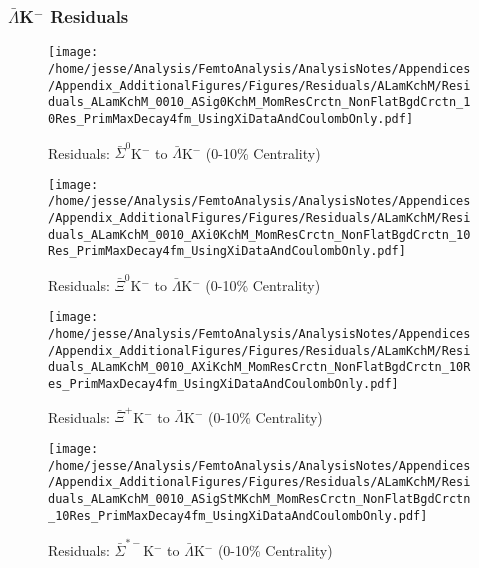 \documentclass[/home/jesse/Analysis/FemtoAnalysis/AnalysisNotes/AnalysisNoteJBuxton.tex]{subfiles}
\begin{document}
\subsubsection{\texorpdfstring{$\bar{\Lambda}$K$^{-}$}{TEXT} Residuals}
\label{Residuals_ALamKchM}

\begin{figure}[h]
  \centering
  \texttt{[image: /home/jesse/Analysis/FemtoAnalysis/AnalysisNotes/Appendices/Appendix\_AdditionalFigures/Figures/Residuals/ALamKchM/Residuals\_ALamKchM\_0010\_ASig0KchM\_MomResCrctn\_NonFlatBgdCrctn\_10Res\_PrimMaxDecay4fm\_UsingXiDataAndCoulombOnly.pdf]}
  \caption[Residuals: $\bar{\Sigma}^{0}$K$^{-}$ to $\bar{\Lambda}$K$^{-}$ (0-10\% Centrality)]{Residuals: $\bar{\Sigma}^{0}$K$^{-}$ to $\bar{\Lambda}$K$^{-}$ (0-10\% Centrality)}
  \label{fig:Res_ALamKchM_0010_ASig0KchM}
\end{figure}

\begin{figure}[h]
  \centering
  \texttt{[image: /home/jesse/Analysis/FemtoAnalysis/AnalysisNotes/Appendices/Appendix\_AdditionalFigures/Figures/Residuals/ALamKchM/Residuals\_ALamKchM\_0010\_AXi0KchM\_MomResCrctn\_NonFlatBgdCrctn\_10Res\_PrimMaxDecay4fm\_UsingXiDataAndCoulombOnly.pdf]}
  \caption[Residuals: $\bar{\Xi}^{0}$K$^{-}$ to $\bar{\Lambda}$K$^{-}$ (0-10\% Centrality)]{Residuals: $\bar{\Xi}^{0}$K$^{-}$ to $\bar{\Lambda}$K$^{-}$ (0-10\% Centrality)}
  \label{fig:Res_ALamKchM_0010_AXi0KchM}
\end{figure}


\begin{figure}[h]
  \centering
  \texttt{[image: /home/jesse/Analysis/FemtoAnalysis/AnalysisNotes/Appendices/Appendix\_AdditionalFigures/Figures/Residuals/ALamKchM/Residuals\_ALamKchM\_0010\_AXiKchM\_MomResCrctn\_NonFlatBgdCrctn\_10Res\_PrimMaxDecay4fm\_UsingXiDataAndCoulombOnly.pdf]}
  \caption[Residuals: $\bar{\Xi}^{+}$K$^{-}$ to $\bar{\Lambda}$K$^{-}$ (0-10\% Centrality)]{Residuals: $\bar{\Xi}^{+}$K$^{-}$ to $\bar{\Lambda}$K$^{-}$ (0-10\% Centrality)}
  \label{fig:Res_ALamKchM_0010_AXiCKchM}
\end{figure}


\begin{figure}[h]
  \centering
  \texttt{[image: /home/jesse/Analysis/FemtoAnalysis/AnalysisNotes/Appendices/Appendix\_AdditionalFigures/Figures/Residuals/ALamKchM/Residuals\_ALamKchM\_0010\_ASigStMKchM\_MomResCrctn\_NonFlatBgdCrctn\_10Res\_PrimMaxDecay4fm\_UsingXiDataAndCoulombOnly.pdf]}
  \caption[Residuals: $\bar{\Sigma}^{*-}$K$^{-}$ to $\bar{\Lambda}$K$^{-}$ (0-10\% Centrality)]{Residuals: $\bar{\Sigma}^{*-}$K$^{-}$ to $\bar{\Lambda}$K$^{-}$ (0-10\% Centrality)}
  \label{fig:Res_ALamKchM_0010_ASigStMKchM}
\end{figure}
\end{document}
